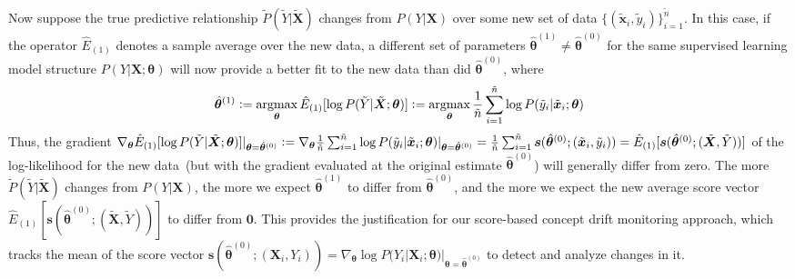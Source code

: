 \documentclass[twoside,11pt]{article}
\DeclareMathOperator*{\argmax}{argmax} %
\begin{document}
Now suppose the true predictive relationship $\tilde{P}(\tilde{Y}|\tilde{\bm{X}})$ changes from $P(Y|\bm{X})$ over some new set of data $\{(\tilde{\bm{x}}_i, \tilde{y}_i)\}_{i=1}^{\tilde{n}}$. In this case, if the operator $\hat{E}_{(1)}$ denotes a sample average over the new data, a different set of parameters $\hat{\bm{\theta}}^{(1)} \neq \hat{\bm{\theta}}^{(0)}$ for the same supervised learning model structure $P(Y|\bm{X};\bm{\theta})$ will now provide a better fit to the new data than did $\hat{\bm{\theta}}^{(0)}$, where 
\begin{align}
\begin{aligned}
\hat{\bm{\theta}}^{(1)} \vcentcolon= \argmax_{\bm{\theta}}\hat{E}_{(1)}[\log{P(\tilde{Y}|\tilde{\bm{X}}; \bm{\theta})}] \vcentcolon= \argmax_{\bm{\theta}}\frac{1}{\tilde{n}}\sum_{i=1}^{\tilde{n}} \log{P(\tilde{y}_i|\tilde{\bm{x}}_i;\bm{\theta})}
\end{aligned}
\label{eqn:score_exp_nonzero_emp}
\end{align}   
Thus, the gradient $\nabla_{\bm{\theta}}\hat{E}_{(1)}[\log{P(\tilde{Y} | \tilde{\bm{X}}; {\bm{\theta}})}]|_{\bm{\theta}=\hat{\bm{\theta}}^{(0)}} \vcentcolon= \nabla_{\bm{\theta}}\frac{1}{\tilde{n}}\sum_{i=1}^{\tilde{n}} \log{P(\tilde{y}_i | \tilde{\bm{x}}_i; {\bm{\theta}})}|_{\bm{\theta}=\hat{\bm{\theta}}^{(0)}} = \\ \frac{1}{\tilde{n}} \sum_{i=1}^{\tilde{n}} \bm{s}(\hat{\bm{\theta}}^{(0)};(\tilde{\bm{x}}_i, \tilde{y}_i)) = \hat{E}_{(1)}[\bm{s}(\hat{\bm{\theta}}^{(0)};(\tilde{\bm{X}}, \tilde{Y}))]$ of the log-likelihood for the new data~(but with the gradient evaluated at the original estimate $\hat{\bm{\theta}}^{(0)}$) will generally differ from zero. The more $\tilde{P}(\tilde{Y}|\tilde{\bm{X}})$ changes from $P(Y|\bm{X})$, the more we expect $\hat{\bm{\theta}}^{(1)}$ to differ from $\hat{\bm{\theta}}^{(0)}$, and the more we expect the new average score vector $\hat{E}_{(1)}[\bm{s}(\hat{\bm{\theta}}^{(0)};(\tilde{\bm{X}}, \tilde{Y}))]$ to differ from $\bm{0}$. This provides the justification for our score-based concept drift monitoring approach, which tracks the mean of the score vector $\bm{s}(\hat{\bm{\theta}}^{(0)};(\bm{X}_i, Y_i)) = \nabla_{\bm{\theta}}\log P(Y_i|\bm{X}_i; \bm{\theta})|_{\bm{\theta}=\hat{\bm{\theta}}^{(0)}}$ to detect and analyze changes in it. 
\end{document}
